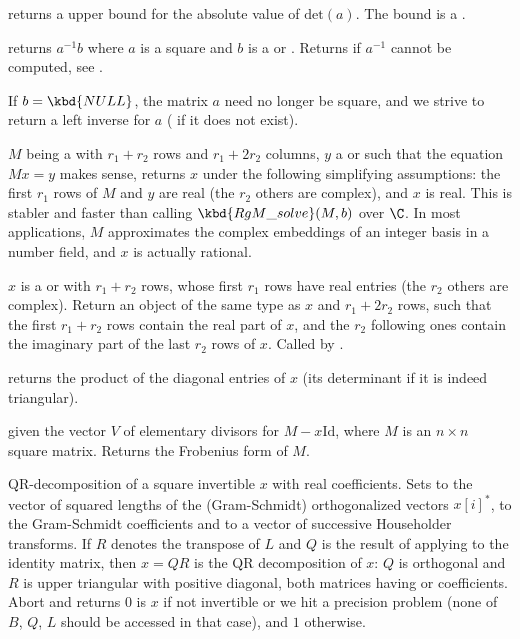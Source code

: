  returns a upper bound for the absolute
value of $\text{det}(a)$. The bound is a .

 returns $a^{-1}b$ where $a$ is a square
 and $b$ is a  or . Returns  if $a^{-1}$
cannot be computed, see .

If $b = \kbd{NULL}$, the matrix $a$ need no longer be square, and we strive
to return a left inverse for $a$ ( if it does not exist).

 $M$ being a 
with $r_1+r_2$ rows and $r_1+2r_2$ columns, $y$ a  or 
such that the equation $Mx = y$ makes sense, returns $x$ under the following
simplifying assumptions: the first $r_1$ rows of $M$ and $y$ are real
(the $r_2$ others are complex), and $x$ is real. This is stabler and faster
than calling $\kbd{RgM\_solve}(M, b)$ over $\C$. In most applications,
$M$ approximates the complex embeddings of an integer basis in a number
field, and $x$ is actually rational.

 $x$ is a  or
 with $r_1 + r_2$ rows, whose first $r_1$ rows have real entries
(the $r_2$ others are complex). Return an object of the same type as
$x$ and $r_1 + 2r_2$ rows, such that the first $r_1 + r_2$ rows contain
the real part of $x$, and the $r_2$ following ones contain the imaginary part
of the last $r_2$ rows of $x$. Called by .

 returns the product of the diagonal
entries of $x$ (its determinant if it is indeed triangular).

 given the vector $V$ of elementary
divisors for $M - x\text{Id}$, where $M$ is an $n\times n$ square matrix.
Returns the Frobenius form of $M$.

QR-decomposition of a square invertible  $x$ with real coefficients.
Sets  to the vector of squared lengths of the (Gram-Schmidt)
orthogonalized vectors $x[i]^*$,  to
the Gram-Schmidt coefficients and  to a vector of successive
Householder transforms. If $R$ denotes the transpose of $L$ and $Q$ is the
result of applying  to the identity matrix, then $x = QR$ is the QR
decomposition of $x$: $Q$ is orthogonal and $R$ is upper triangular with
positive diagonal, both matrices having  or  coefficients.
Abort and returns $0$ is $x$ if not invertible or we hit a precision problem
(none of $B$, $Q$, $L$ should be accessed in that case), and $1$ otherwise.

